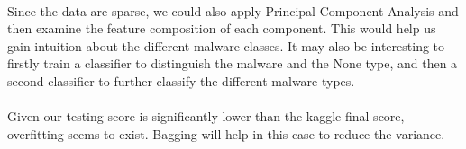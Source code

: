 \documentclass[11pt]{article}
\begin{document}
\paragraph{}Since the data are sparse, we could also apply Principal Component Analysis and then examine the feature composition of each component. This would help us gain intuition about the different malware classes. It may also be interesting to firstly train a classifier to distinguish the malware and the None type, and then a second classifier to further classify the different malware types. 

\paragraph{}Given our testing score is significantly lower than the kaggle final score, overfitting seems to exist. Bagging will help in this case to reduce the variance.
\end{document}

